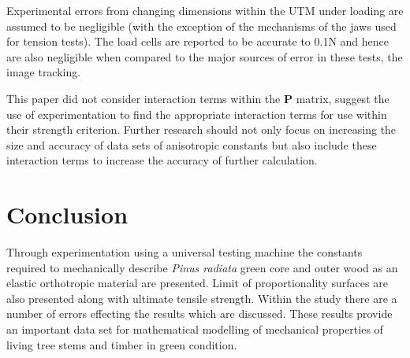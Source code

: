 \documentclass[10pt]{article}
\begin{document}
Experimental errors from changing dimensions within the UTM under loading are assumed to be negligible (with the exception of the mechanisms of the jaws used for tension tests). The load cells are reported to be accurate to 0.1N and hence are also negligible when compared to the major sources of error in these tests, the image tracking.

This paper did not consider interaction terms within the \textbf{P} matrix, \citet{tsai_general_1971} suggest the use of experimentation to find the appropriate interaction terms for use within their strength criterion. Further research should not only focus on increasing the size and accuracy of data sets of anisotropic constants but also include these interaction terms to increase the accuracy of further calculation.

\section{Conclusion}
Through experimentation using a universal testing machine the constants required to mechanically describe \textit{Pinus radiata} green core and outer wood as an elastic orthotropic material are presented. Limit of proportionality surfaces are also presented along with ultimate tensile strength. Within the study there are a number of errors effecting the results which are discussed. These results provide an important data set for mathematical modelling of mechanical properties of living tree stems and timber in green condition.

\pagebreak

{}

\end{document}
